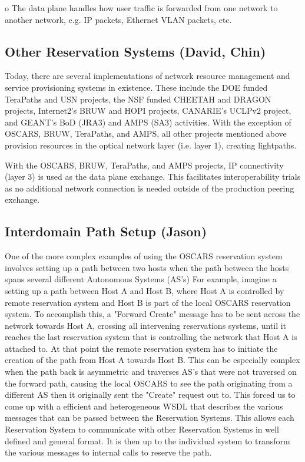 \documentclass[conference]{IEEEtran}
\begin{document}
o The data plane handles how user traffic is forwarded from one network to 
another network, e.g. IP packets, Ethernet VLAN packets, etc.

\subsection{Other Reservation Systems (David, Chin)}

Today, there are several implementations of network resource management and
service provisioning systems in existence.  These include the DOE funded
TeraPaths and USN projects, the NSF funded CHEETAH and DRAGON projects,
Internet2's BRUW and HOPI projects,  CANARIE's UCLPv2 project, and GEANT's
BoD (JRA3) and AMPS (SA3) activities.  With the exception of OSCARS, BRUW,
TeraPaths, and AMPS, all other projects mentioned above provision resources
in the optical network layer (i.e. layer 1), creating lightpaths.

With the OSCARS, BRUW, TeraPaths, and AMPS projects, IP connectivity (layer
3) is used as the data plane exchange.  This facilitates interoperability
trials as no additional network connection is needed outside of the production
peering exchange.

\subsection{Interdomain Path Setup (Jason)}
One of the more complex examples of using the OSCARS reservation system involves
setting up a path between two hosts when the path between the hosts spans
several different Autonomous Systems (AS's) For example, imagine a setting up a
path between Host A and Host B, where Host A is controlled by remote reservation
system and Host B is part of the local OSCARS reservation system.  To accomplish
this, a "Forward Create" message has to be sent across the network towards Host
A, crossing all intervening reservations systems, until it reaches the last
reservation system that is controlling the network that Host A is attached to.
At that point the remote reservation system has to initiate the creation of the
path from Host A towards Host B.  This can be especially complex when the path
back is asymmetric and traverses AS's that were not traversed on the forward
path, causing the local OSCARS to see the path originating from a different 
AS then it originally sent the "Create" request out to. This forced us
to come up with a efficient and heterogeneous WSDL that describes the various
messages that can be passed between the Reservation Systems. This allows
each Reservation System to communicate with other Reservation Systems in 
well defined and general format. It is then up to the individual system to 
transform the various messages to internal calls to reserve the path.
\end{document}
